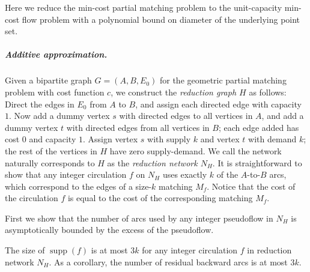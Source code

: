 \documentclass[a4paper,UKenglish]{socg-lipics-v2018}
\def\eps{\varepsilon}
\def\set#1{\{ #1 \}}
\def\supp{\operatorname{supp}}
\theoremstyle{plain}
\numberwithin{figure}{section}
\renewcommand{\paragraph}{\subparagraph}
\def\EMPH#1{\textcolor{BrickRed}{{\emph{#1}}}}
\begin{document}
Here we reduce the min-cost partial matching problem to the unit-capacity min-cost flow problem with a polynomial bound on diameter of the underlying point set.


\paragraph{Additive approximation.}
Given a bipartite graph $G = (A,B,E_0)$ for the geometric partial matching problem with cost function $c$, we construct the \EMPH{reduction graph $H$} as follows:
Direct the edges in $E_0$ from $A$ to $B$, and assign each directed edge with capacity $1$.  Now add a dummy vertex $s$ with directed edges to all vertices in $A$, and add a dummy vertex $t$ with directed edges from all vertices in $B$; each edge added has cost $0$ and capacity $1$.
Assign vertex $s$ with supply $k$ and vertex $t$ with demand $k$; the rest of the vertices in $H$ have zero supply-demand.
We call the network naturally corresponds to $H$ as the \EMPH{reduction network $N_H$}.
%
It is straightforward to show that any integer circulation $f$ on $N_H$ uses exactly
$k$ of the $A$-to-$B$ arcs, which correspond to the edges of a size-$k$
matching \EMPH{$M_f$}.
Notice that the cost of the circulation $f$ is equal to the cost of the corresponding matching $M_f$.
%

First we show that the number of arcs used by any integer pseudoflow in $N_H$ is asymptotically bounded by the excess of the pseudoflow.

\begin{lemmarep}
\label{lemma:support_size}
The size of $\supp(f)$ is at most $3k$ for any integer circulation $f$ in reduction network $N_H$.
As a corollary, the number of residual backward arcs is at most $3k$.
\end{lemmarep}
\end{document}
